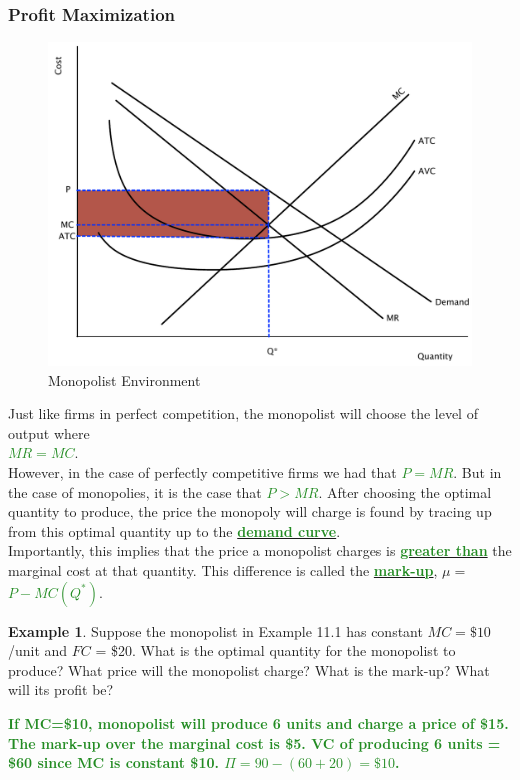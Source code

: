 \documentclass[11pt]{article}\usepackage[]{graphicx}\usepackage[]{color}
\theoremstyle{definition}
\newtheorem{exmp}{Example}[section]
\newcommand{\blank}[1]{}
\newcommand{\ddp}[1]{{\textbf{\textcolor{ForestGreen}{#1}}}}
\newcommand{\dd}[1]{{\underline{\textbf{\textcolor{ForestGreen}{#1}}}}}
\begin{document}
	
	\subsubsection*{Profit Maximization}
	
		
		\begin{figure}[H]
			\centering
			\includegraphics[scale=.40]{plot75.pdf}
			\caption{Monopolist Environment}
		\end{figure}
	
	Just like firms in perfect competition, the monopolist will choose the level of output where \\ \dd{$MR = MC$}. 
	\\
	
	However, in the case of perfectly competitive firms we had that \dd{$P = MR$}. But in the case of monopolies, it is the case that \dd{$P > MR$}. After choosing the optimal quantity to produce, the price the monopoly will charge is found by tracing up from this optimal quantity up to the \dd{demand curve}.
	\\
	
	Importantly, this implies that the price a monopolist charges is \dd{greater than} the marginal cost at that quantity. This difference is called the \dd{mark-up}, $\mu = $ \dd{$P - MC(Q^*)$}.
	\\
	
	\begin{exmp}
		Suppose the monopolist in Example 11.1 has constant $MC=\$10$/unit and $FC$ = \$20. What is the optimal quantity for the monopolist to produce? What price will the monopolist charge? What is the mark-up? What will its profit be?
	\end{exmp}
	\ddp{If MC=\$10, monopolist will produce 6 units and charge a price of \$15. The mark-up over the marginal cost is \$5. VC of producing 6 units = \$60 since MC is constant \$10. $\Pi = 90 - (60 + 20) = \$10$.}
	\blank{}
	
\end{document}
